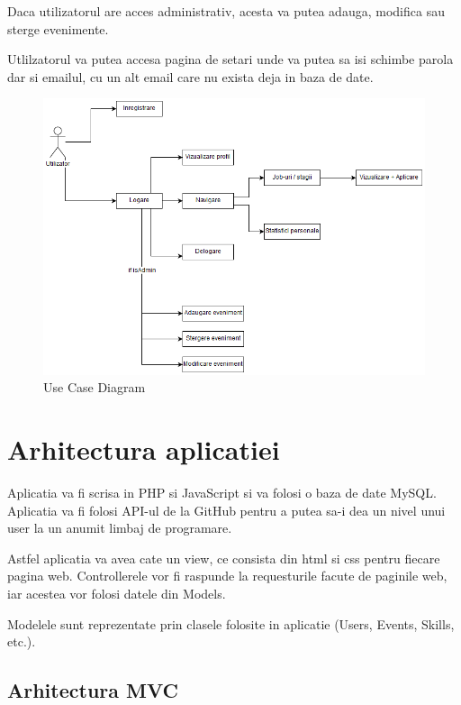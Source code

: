 \documentclass{article}
\begin{document}
Daca utilizatorul are acces administrativ, acesta va putea adauga, modifica sau sterge evenimente.

Utlilzatorul va putea accesa pagina de setari unde va putea sa isi schimbe parola dar si emailul, cu un alt email care nu exista deja in baza de date.


\begin{figure}[H]
	\includegraphics[width=1\textwidth]{Use-Case-Diagram.png}
	\caption{Use Case Diagram}
\end{figure}

\bigskip

\section{Arhitectura aplicatiei}

Aplicatia va fi scrisa in PHP si JavaScript si va folosi o baza de date MySQL. Aplicatia va fi folosi API-ul de la GitHub pentru a putea sa-i dea un nivel unui user la un anumit limbaj de programare. 

Astfel aplicatia va avea cate un view, ce consista din html si css pentru fiecare pagina web. Controllerele vor fi raspunde la requesturile facute de paginile web, iar acestea vor folosi datele din Models. 

Modelele sunt reprezentate prin clasele folosite in aplicatie (Users, Events, Skills, etc.).


\subsection{Arhitectura MVC}
\end{document}
